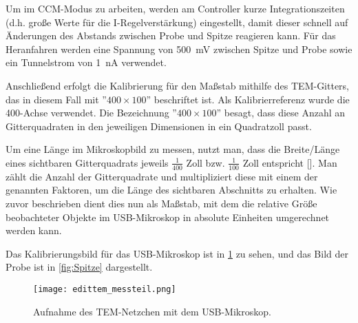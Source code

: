 Um im CCM-Modus zu arbeiten, werden am Controller kurze Integrationszeiten (d.h. große Werte für die I-Regelverstärkung) eingestellt, damit dieser schnell auf Änderungen des Abstands zwischen Probe und Spitze reagieren kann. Für das Heranfahren werden eine Spannung von \SI{500}{\mV} zwischen Spitze und Probe sowie ein Tunnelstrom von \SI{1}{\nA} verwendet.

Anschließend erfolgt die Kalibrierung für den Maßstab mithilfe des TEM-Gitters, das in diesem Fall mit ''$400 \times 100$'' beschriftet ist. Als Kalibrierreferenz wurde die 400-Achse verwendet. Die Bezeichnung ''$400 \times 100$'' besagt, dass diese Anzahl an Gitterquadraten in den jeweiligen Dimensionen in ein Quadratzoll passt.

Um eine Länge im Mikroskopbild zu messen, nutzt man, dass die Breite/Länge eines sichtbaren Gitterquadrats jeweils $\frac{1}{400}$ Zoll bzw. $\frac{1}{100}$ Zoll entspricht [\cite{praktikum}]. Man zählt die Anzahl der Gitterquadrate und multipliziert diese mit einem der genannten Faktoren, um die Länge des sichtbaren Abschnitts zu erhalten. Wie zuvor beschrieben dient dies nun als Maßstab, mit dem die relative Größe beobachteter Objekte im USB-Mikroskop in absolute Einheiten umgerechnet werden kann.

Das Kalibrierungsbild für das USB-Mikroskop ist in \cref{fig:Messteil} zu sehen, und das Bild der Probe ist in \cref{fig:Spitze} dargestellt.

\begin{figure}[htbp]
    \centering
    \texttt{[image: edittem\_messteil.png]}
    \caption{Aufnahme des TEM-Netzchen mit dem USB-Mikroskop.}
    \label{fig:Messteil}
\end{figure}



